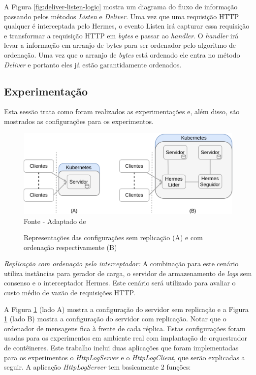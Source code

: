 A Figura \ref{fig:deliver-listen-logic} mostra um diagrama do fluxo de informação passando pelos métodos \textit{Listen} e \textit{Deliver}. Uma vez que uma requisição HTTP qualquer é interceptada pelo Hermes, o evento Listen irá capturar essa requisição e transformar a requisição HTTP em \textit{bytes} e passar ao \textit{handler}. O \textit{handler} irá levar a informação em arranjo de bytes para ser ordenador pelo algoritmo de ordenação. Uma vez que o arranjo de \textit{bytes} está ordenado ele entra no método \textit{Deliver} e portanto eles já estão garantidamente ordenados.


\subsection{Experimentação}

Esta sessão trata como foram realizados as experimentações e, além disso, são mostrados as configurações para os experimentos.

\begin{figure}[htb!]
\centering
\caption{Representações das configurações sem replicação (A) e com ordenação respectivamente (B)}
\includegraphics[width=\linewidth]{figures/confiuracoes-kubernetes.drawio.png}
{\flushleft Fonte - Adaptado de \textcite{renan2021hermes}}
\label{fig:arquitetura-cluster-ordenadores}
\end{figure}

\textit{Replicação com ordenação pelo interceptador:} A combinação para este cenário utiliza instâncias para gerador de carga, o servidor de armazenamento de \textit{logs}
sem consenso e o interceptador Hermes. Este cenário será utilizado para avaliar o custo médio de vazão de requisições HTTP.

\pagebreak

A Figura \ref{fig:arquitetura-cluster-ordenadores} (lado A) mostra a configuração do servidor sem replicação e a Figura \ref{fig:arquitetura-cluster-ordenadores} (lado B) mostra a configuração do servidor com replicação. Notar que o ordenador de mensagens fica à frente de cada réplica. Estas configurações foram usadas para os experimentos em ambiente real com implantação de orquestrador de contêineres. Este trabalho inclui duas aplicações que foram implementadas para os experimentos o \textit{HttpLogServer} e o \textit{HttpLogClient}, que serão explicadas a seguir. A aplicação \textit{HttpLogServer} tem basicamente 2 funções:

